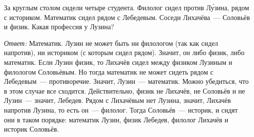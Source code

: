 За круглым столом сидели четыре студента.
Филолог сидел против Л\'{у}зина, рядом с историком.
Математик сидел рядом с Лебедевым.
Соседи Лихачёва~--- Соловьёв и физик.
Какая профессия у Лузина?

\solution
\emph{Ответ:} Математик.
Лузин не может быть ни филологом (так как сидел напротив), ни историком
(с которым сидел рядом).
Значит, он либо физик, либо математик.
Если Лузин физик, то Лихачёв сидел между физиком Лузиным и филологом
Соловьёвым.
Но тогда математик не может сидеть рядом с Лебедевым~--- противоречие.
Значит, Лузин~--- математик.
Можно убедиться, что в этом случае все сходится.
Действительно, физик не Лихачёв, не Соловьёв и не Лузин~--- значит, Лебедев.
Рядом с Лихачёвым нет Лузина, значит, Лихачёв напротив Лузина, то есть он~---
филолог.
Тогда Соловьёв~--- историк, и сидят они в таком порядке:
математик Лузин, физик Лебедев, филолог Лихачёв и историк Соловьёв.

